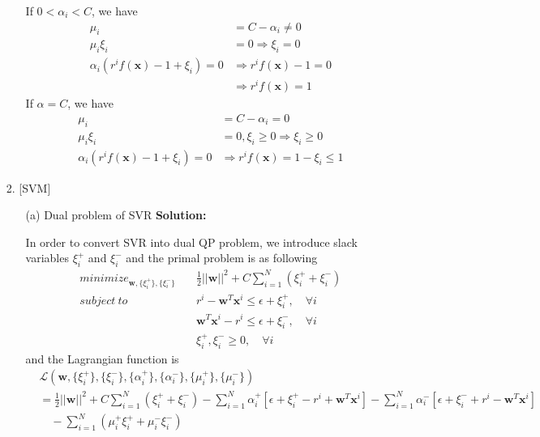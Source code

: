 \documentclass{article}
\renewcommand{\b}[1]{\bm{#1}}
\begin{document}
\begin{enumerate}
\begin{enumerate}
        If $0<\alpha_i<C$, we have 
        \begin{align*}
            \mu_i &= C-\alpha_i \neq 0\\
            \mu_i\xi_i &= 0\Rightarrow\xi_i=0\\
            \alpha_i(r^if(\b{x})-1+\xi_i)=0&\Rightarrow r^if(\b{x})-1= 0\\
            &\Rightarrow r^if(\b{x})= 1 
        \end{align*} 
        If $\alpha=C$, we have
        \begin{align*}
            \mu_i &= C-\alpha_i = 0\\
            \mu_i\xi_i &= 0, \xi_i\geq 0\Rightarrow\xi_i\geq 0\\
            \alpha_i(r^if(\b{x})-1+\xi_i)=0&\Rightarrow r^if(\b{x})=1-\xi_i\leq 1
        \end{align*}
    \end{enumerate}
    \item [2.] [SVM]
    \begin{enumerate}
        \item [(a)] Dual problem of SVR\newline
        {\bf Solution:}
        \par In order to convert SVR into dual QP problem, we introduce slack variables $\xi_i^+$ and $\xi_i^-$ and the primal problem is as following
        \begin{align*}
            minimize_{\b{w},\{\xi_i^+\},\{\xi_i^-\}}\quad & \frac{1}{2}||\b{w}||^2+C\sum_{i=1}^N(\xi_i^++\xi_i^-)\\
            subject\ to\quad & r^i-\b{w}^T\b{x}^i\leq \epsilon+\xi_i^+,\quad\forall i\\
            & \b{w}^T\b{x}^i-r^i\leq \epsilon+\xi_i^-,\quad\forall i\\
            & \xi_i^+,\xi_i^-\geq 0,\quad\forall i
        \end{align*}
        and the Lagrangian function is 
        \begin{align*}
            &\mathcal{L}(\b{w},\{\xi_i^+\},\{\xi_i^-\},\{\alpha_i^+\},\{\alpha_i^-\},\{\mu_i^+\},\{\mu_i^-\})\\
            &= \frac{1}{2}||\b{w}||^2+C\sum_{i=1}^N(\xi_i^++\xi_i^-)-\sum_{i=1}^N\alpha_i^+[\epsilon+\xi_i^+-r^i+\b{w}^T\b{x}^i]
            -\sum_{i=1}^N\alpha_i^-[\epsilon+\xi_i^-+r^i-\b{w}^T\b{x}^i]\\ &\quad-\sum_{i=1}^N(\mu_i^+\xi_i^++\mu_i^-\xi_i^-)
        \end{align*}

\end{enumerate}
\end{enumerate}
\end{document}
